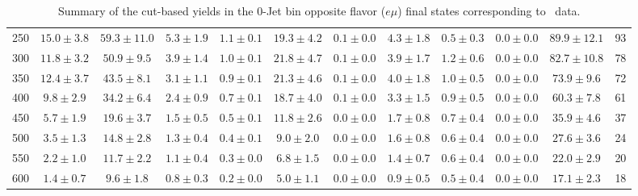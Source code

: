 \begin{table}[!ht]
{\begin{center}
\begin{tabular}{l c c c c c c c c c c c }
250 & $15.0\pm3.8$ & $59.3\pm11.0$ & $5.3\pm1.9$ & $1.1\pm0.1$ & $19.3\pm4.2$ & $0.1\pm0.0$ & $4.3\pm1.8$ & $0.5\pm0.3$ & $0.0\pm0.0$ & $89.9\pm12.1$ & 93 \\
300 & $11.8\pm3.2$ & $50.9\pm9.5$ & $3.9\pm1.4$ & $1.0\pm0.1$ & $21.8\pm4.7$ & $0.1\pm0.0$ & $3.9\pm1.7$ & $1.2\pm0.6$ & $0.0\pm0.0$ & $82.7\pm10.8$ & 78 \\
350 & $12.4\pm3.7$ & $43.5\pm8.1$ & $3.1\pm1.1$ & $0.9\pm0.1$ & $21.3\pm4.6$ & $0.1\pm0.0$ & $4.0\pm1.8$ & $1.0\pm0.5$ & $0.0\pm0.0$ & $73.9\pm9.6$ & 72 \\
400 & $9.8\pm2.9$ & $34.2\pm6.4$ & $2.4\pm0.9$ & $0.7\pm0.1$ & $18.7\pm4.0$ & $0.1\pm0.0$ & $3.3\pm1.5$ & $0.9\pm0.5$ & $0.0\pm0.0$ & $60.3\pm7.8$ & 61 \\
450 & $5.7\pm1.9$ & $19.6\pm3.7$ & $1.5\pm0.5$ & $0.5\pm0.1$ & $11.8\pm2.6$ & $0.0\pm0.0$ & $1.7\pm0.8$ & $0.7\pm0.4$ & $0.0\pm0.0$ & $35.9\pm4.6$ & 37 \\
500 & $3.5\pm1.3$ & $14.8\pm2.8$ & $1.3\pm0.4$ & $0.4\pm0.1$ & $9.0\pm2.0$ & $0.0\pm0.0$ & $1.6\pm0.8$ & $0.6\pm0.4$ & $0.0\pm0.0$ & $27.6\pm3.6$ & 24 \\
550 & $2.2\pm1.0$ & $11.7\pm2.2$ & $1.1\pm0.4$ & $0.3\pm0.0$ & $6.8\pm1.5$ & $0.0\pm0.0$ & $1.4\pm0.7$ & $0.6\pm0.4$ & $0.0\pm0.0$ & $22.0\pm2.9$ & 20 \\
600 & $1.4\pm0.7$ & $9.6\pm1.8$ & $0.8\pm0.3$ & $0.2\pm0.0$ & $5.0\pm1.1$ & $0.0\pm0.0$ & $0.9\pm0.5$ & $0.5\pm0.4$ & $0.0\pm0.0$ & $17.1\pm2.3$ & 18 \\
\hline
\end{tabular}
\end{center}
}
\caption{Summary of the cut-based yields in the 0-Jet bin opposite flavor ($e\mu$) final states corresponding to \intlumi\ data.}
\end{table}

